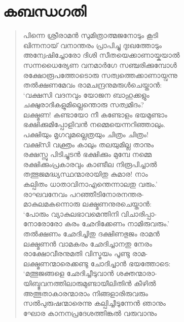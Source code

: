 \section{കബന്ധഗതി}

\begin{verse}
പിന്നെ ശ്രീരാമന്‍ സുമിത്രാത്മജനോടും കൂടി\\
ഖിന്നനായ് വനാന്തരം പ്രാപിച്ചു ദുഃഖത്തോടും\\
അന്വേഷിച്ചോരോ ദിശി സീതയെക്കാണായ്കയാല്‍\\
സന്നധൈര്യേണ വനമാര്‍ഗേ സഞ്ചരിക്കുമ്പോള്‍\\
രക്ഷോരൂപത്തോടൊരു സത്വത്തെക്കാണായ്വന്നു\\
തല്‍ക്ഷണമേവം രാമചന്ദ്രനുമരുള്‍ചെയ്താന്‍:\\
‘വക്ഷസി വദനവും യോജന ബാഹുക്കളും\\
ചക്ഷുരാദികളുമില്ലെന്തൊരു സത്വമിദം?\\
ലക്ഷ്മണ! കണ്ടായോ നീ കണ്ടോളം ഭയമുണ്ടാം\\
ഭക്ഷിക്കുമിപ്പോളിവന്‍ നമ്മെയെന്നറിഞ്ഞാലും.\\
പക്ഷിയും മൃഗവുമല്ലെത്രയും ചിത്രം ചിത്രം!\\
വക്ഷ്സി വക്ത്രം കാലും തലയുമില്ല താനും\\
രക്ഷസ്സു പിടിച്ചുടന്‍ ഭക്ഷിക്കും മുമ്പേ നമ്മെ\\
രക്ഷിക്കുംപ്രകാരവും കാണ്ടീല നിരൂപിച്ചാല്‍\\
തത്ഭുജമദ്ധ്യസ്ഥന്മാരായിതു കുമാര! നാം\\
കല്പിതം ധാതാവിനാഎന്തെന്നാലതു വരും.’\\
രാഘവനേവം പറഞ്ഞീടിനോരനന്തര-\\
മാകുലമകന്നൊരു ലക്ഷ്മണനുരചെയ്താന്‍:\\
‘പോരും വ്യാകുലഭാവമെന്തിനി വിചാരിപ്പാ-\\
നോരോരോ കരം ഛേദിക്കേണം നാമിരുവരും.’\\
തല്‍ക്ഷണം ഛേദിച്ചിതു ദക്ഷിണഭുജം രാമന്‍\\
ലക്ഷ്മണന്‍ വാമകരം ഛേദിച്ചാനതു നേരം\\
രാക്ഷോവീരനുമതി വിസ്മയം പൂണ്ടു രാമ-\\
ലക്ഷ്മണന്മാരെക്കണ്ടു ചോദിച്ചാന്‍ ഭയത്തോടെ:\\
‘മത്ഭുജങ്ങളെ ഛേദിച്ചീടുവാന്‍ ശക്തന്മാരാ-\\
യിബ്ഭുവനത്തിലാരുമുണ്ടായീലിതിന്‍ കീഴില്‍\\
അത്ഭുതാകാരന്മാരാം നിങ്ങളാരിരുവരും\\
സല്‍പുരുഷന്മാരെന്നു കല്പിച്ചീടുന്നേന്‍ ഞാനും\\
ഘോര കാനനപ്രദേശത്തിങ്കല്‍ വരുവാനും\\

\end{verse}
